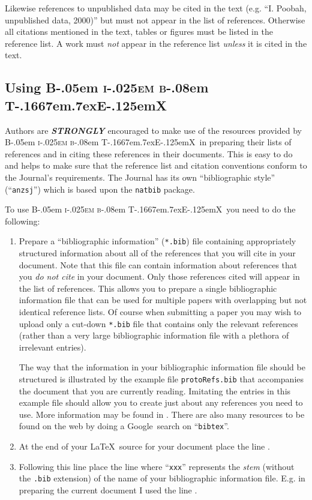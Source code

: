 \documentclass[times, doublespace]{anzsauth}
\newcommand\BibTeX{{\rmfamily B\kern-.05em \textsc{i\kern-.025em b}\kern-.08em
T\kern-.1667em\lower.7ex\hbox{E}\kern-.125emX}}
\begin{document}
Likewise references to unpublished data may be cited in the text
(e.g. ``I. Poobah, unpublished data, 2000)'' but must not appear in
the list of references.  Otherwise all citations mentioned in the
text, tables or figures must be listed in the reference list. A
work must \emph{not} appear in the reference list \emph{unless}
it is cited in the text.

\subsection{Using \BibTeX}
\label{sec:useBib}

Authors are \textbf{\textit{STRONGLY}} encouraged to make use of
the resources provided by \BibTeX\ in preparing their lists of references
and in citing these references in their documents.  This is easy
to do and helps to make sure that the reference list and citation
conventions conform to the Journal's requirements.  The Journal
has its own ``bibliographic style'' (``\texttt{anzsj}'') which is
based upon the \texttt{natbib} package.

To use \BibTeX\ you need to do the following:
\begin{enumerate}
\item Prepare a ``bibliographic information'' (\texttt{*.bib})
file containing appropriately structured information about all of
the references that you will cite in your document.  Note that this
file can contain information about references that you \emph{do not
cite} in your document.  Only those references cited will appear
in the list of references.  This allows you to prepare a single
bibliographic information file that can be used for multiple papers
with overlapping but not identical reference lists.  Of course
when submitting a paper you may wish to upload only a cut-down
\texttt{*.bib} file that contains only the relevant references
(rather than a very large bibliographic information file with a
plethora of irrelevant entries).

The way that the information in your bibliographic information
file should be structured is illustrated by the example file
\texttt{protoRefs.bib} that accompanies the document that you are
currently reading.  Imitating the entries in this example file should
allow you to create just about any references you need to use.
More information may be found in \cite{MittelbachGoossens2004}.
There are also many resources to be found on the web by doing a
Google\texttrademark\ search on ``\texttt{bibtex}''.

\item At the end of your \LaTeX\ source for your document place the line
\verb!!.
\item Following this line place the line \verb!!
where ``\texttt{xxx}'' represents the \emph{stem} (without the \texttt{.bib}
extension) of the name of your bibliographic information file.
E.g. in preparing the current document I used the line
\verb!!.
\end{enumerate}
\end{document}
